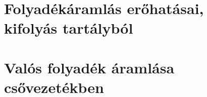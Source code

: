 \documentclass[11pt, a4paper]{report}
\begin{document}























\chapter{Folyadékáramlás erőhatásai, kifolyás tartályból}
































\chapter{Valós folyadék áramlása csővezetékben}



\end{document}
